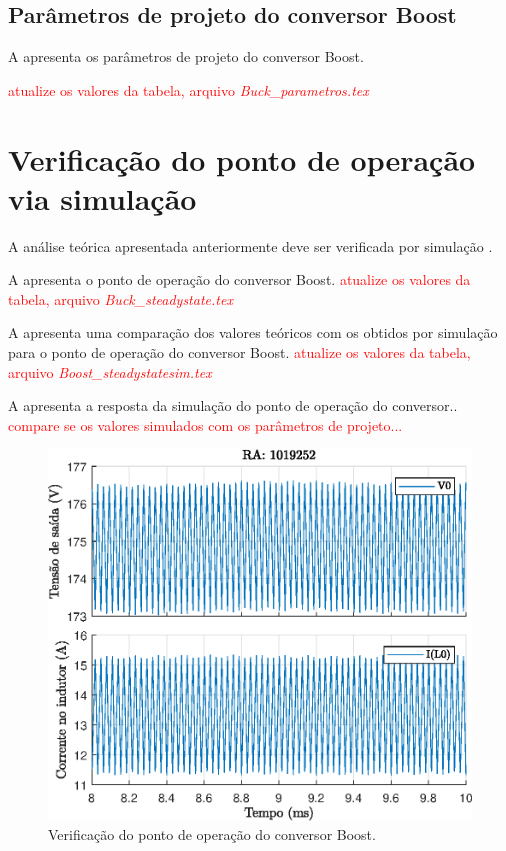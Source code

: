 \subsection{Parâmetros de projeto do conversor Boost}


A  apresenta os parâmetros de projeto do conversor Boost.

\textcolor{red}{atualize os valores da tabela, arquivo \emph{Buck\_parametros.tex} }





\section{Verificação do ponto de operação via simulação}

A análise teórica apresentada anteriormente deve ser verificada por simulação \cite{noauthor_psim_nodate}.

A  apresenta o ponto de operação do conversor Boost.
\textcolor{red}{atualize os valores da tabela, arquivo \emph{Buck\_steadystate.tex} }




A  apresenta uma comparação dos valores teóricos com os obtidos por simulação para o ponto de operação do conversor Boost.
\textcolor{red}{atualize os valores da tabela, arquivo \emph{Boost\_steadystatesim.tex} }



A  apresenta a resposta da simulação do ponto de operação do conversor..  \textcolor{red}{compare se os valores simulados com os parâmetros de projeto...}

\begin{figure}[!ht]
	\centering
	\includegraphics[width=0.9\linewidth]{Figs/Boost}
	\caption{Verificação do ponto de operação do conversor Boost.}
	\label{fig:boost-steadystate}
\end{figure}

